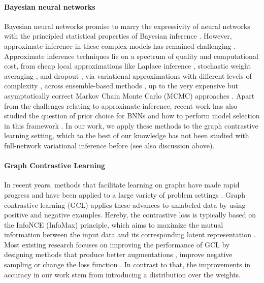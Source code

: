 \documentclass[tablecaption=bottom,wcp]{jmlr} %
\begin{document}
\paragraph{Bayesian neural networks}

Bayesian neural networks promise to marry the expressivity of neural networks with the principled statistical properties of Bayesian inference \citep{mackay1992practical, neal1993bayesian}.
However, approximate inference in these complex models has remained challenging \citep{jospin2022hands}.
Approximate inference techniques lie on a spectrum of quality and computational cost, from cheap local approximations like Laplace inference \citep{laplace1774memoires, mackay1992practical, khan2019approximate, daxberger2021laplace}, stochastic weight averaging \citep{izmailov2018averaging, maddox2019simple}, and dropout \citep{gal2016dropout, kingma2015variational}, via variational approximations with different levels of complexity \citep[e.g.,][]{graves2011vi, blundell2015bbb, louizos2016structured, khan2018vogn, osawa2019practical}, across ensemble-based methods \citep{lakshminarayanan2017simple, wang2019function, wilson2020bayesian, ciosek2020conservative, he2020bayesian, d2021stein, d2021repulsive}, up to the very expensive but asymptotically correct Markov Chain Monte Carlo (MCMC) approaches \citep[e.g.,][]{neal1993bayesian, neal2011mcmc, welling2011bayesian, garriga2021exact, izmailov2021hmc}.
Apart from the challenges relating to approximate inference, recent work has also studied the question of prior choice for BNNs \citep[e.g.,][and references therein]{fortuin2021bnnpriors, fortuin2022bayesian, nabarro2022data, sharma2023incorporating, fortuin2022priors} and how to perform model selection in this framework \citep[e.g.,][]{immer2021scalable, immer2022invariance, rothfuss2021pacoh, rothfuss2022pac, van2022learning, schwobel2022last}.
In our work, we apply these methods to the graph contrastive learning setting, which to the best of our knowledge has not been studied with full-network variational inference before (see also discussion above).

\paragraph{Graph Contrastive Learning}

In recent years, methods that facilitate learning on graphs have made rapid progress and have been applied to a large variety of problem settings \citep[e.g.,][]{kipf2016semi,xu2018powerful,GTgraph_elv,edge_nets_elv}. Graph contrastive learning (GCL) applies these advances to unlabeled data by using positive and negative examples. Hereby, the contrastive loss is typically based on the InfoNCE (InfoMax) principle, which aims to maximize the mutual information between the input data and its corresponding latent representation \citep{GraphCL,Oord2018,Grace}. Most existing research focuses on improving the performance of GCL by designing methods that produce better augmentations \citep[e.g.,][]{aug3_bag, aug_back1, aug_back_2}, improve negative sampling \citep[e.g.,][]{neg_samp_back1, neg_samples_back2, Grace} or change the loss function \citep[e.g.,][]{back_loss, aug_back1}. In contrast to that, the improvements in accuracy in our work stem from introducing a distribution over the weights.
\end{document}
